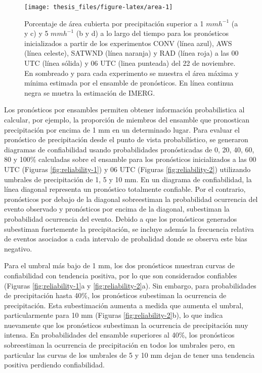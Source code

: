 \documentclass[12pt,oneside,a4paper]{reedthesis}
\begin{document}
\begin{figure}
\texttt{[image: thesis\_files/figure-latex/area-1]} \caption{Porcentaje de área cubierta por precipitación superior a 1 \(mmh^{-1}\) (a y c) y 5 \(mmh^{-1}\) (b y d) a lo largo del tiempo para los pronósticos inicializados a partir de los experimentos CONV (línea azul), AWS (línea celeste), SATWND (línea naranja) y RAD (línea roja) a las 00 UTC (línea sólida) y 06 UTC (linea punteada) del 22 de noviembre. En sombreado y para cada experimento se muestra el área máxima y mínima estimada por el ensamble de pronósticos. En línea continua negra se muetra la estimación de IMERG.}\label{fig:area}
\end{figure}
Los pronósticos por ensambles permiten obtener información probabilistica al calcular, por ejemplo, la proporción de miembros del ensamble que pronostican precipitación por encima de 1 mm en un determinado lugar. Para evaluar el pronóstico de precipitación desde el punto de vista probabilístico, se generaron diagramas de confiabilidad usando probabilidades pronósticadas de 0, 20, 40, 60, 80 y 100\% calculadas sobre el ensamble para los pronósticos inicializados a las 00 UTC (Figuras \ref{fig:reliability-1}) y 06 UTC (Figuras \ref{fig:reliability-2}) utilizando umbrales de precipitación de 1, 5 y 10 mm. En un diagrama de confiabilidad, la línea diagonal representa un pronóstico totalmente confiable. Por el contrario, pronósticos por debajo de la diagonal sobreestiman la probabilidad ocurrencia del evento observado y pronósticos por encima de la diagonal, subestiman la probabilidad ocurrencia del evento. Debido a que los pronósticos generados subestiman fuertemente la precipitación, se incluye además la frecuencia relativa de eventos asociados a cada intervalo de probalidad donde se observa este bias negativo.

Para el umbral más bajo de 1 mm, los dos pronósticos muestran curvas de confiabilidad con tendencia positiva, por lo que son considerados confiables (Figuras \ref{fig:reliability-1}a y \ref{fig:reliability-2}a). Sin embargo, para probabilidades de precipitación hasta 40\%, los pronósticos subestiman la ocurrencia de precipitación. Esta subestimación aumenta a medida que aumenta el umbral, particularmente para 10 mm (Figuras \ref{fig:reliability-2}b), lo que indica nuevamente que los pronósticos subestiman la ocurrencia de precipitación muy intensa. En probabilidades del ensamble superiores al 40\%, los pronósticos sobreestiman la ocurrencia de precipitación en todos los umbrales pero, en particular las curvas de los umbrales de 5 y 10 mm dejan de tener una tendencia positiva perdiendo confiabilidad.
\end{document}
